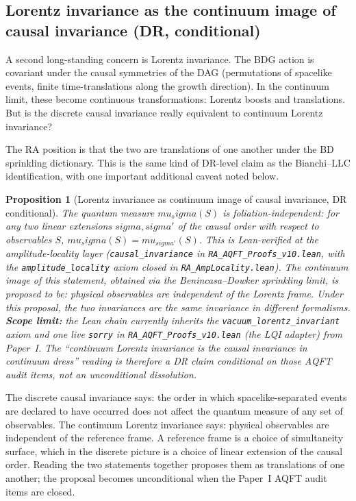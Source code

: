 \documentclass[11pt]{article}
\def\sigma{sigma}%
\def\mu{mu}%
\newtheorem{proposition}{Proposition}
\begin{document}
\subsection{Lorentz invariance as the continuum image of causal invariance (DR, conditional)}
\label{sec:lorentz_is_causal}

A second long-standing concern is Lorentz invariance. The BDG action is covariant under the causal symmetries of the DAG (permutations of spacelike events, finite time-translations along the growth direction). In the continuum limit, these become continuous transformations: Lorentz boosts and translations. But is the discrete causal invariance really equivalent to continuum Lorentz invariance?

The RA position is that the two are translations of one another under the BD sprinkling dictionary. This is the same kind of DR-level claim as the Bianchi--LLC identification, with one important additional caveat noted below.

\begin{proposition}[Lorentz invariance as continuum image of causal invariance, DR conditional]
\label{prop:lorentz_causal}
The quantum measure $\mu_\sigma(S)$ is foliation-independent: for any two linear extensions $\sigma, \sigma'$ of the causal order with respect to observables $S$, $\mu_\sigma(S) = \mu_{\sigma'}(S)$. This is Lean-verified at the amplitude-locality layer (\texttt{causal\_invariance} in \texttt{RA\_AQFT\_Proofs\_v10.lean}, with the \texttt{amplitude\_locality} axiom closed in \texttt{RA\_AmpLocality.lean}). The continuum image of this statement, obtained via the Benincasa--Dowker sprinkling limit, is proposed to be: physical observables are independent of the Lorentz frame. Under this proposal, the two invariances are the same invariance in different formalisms. \textbf{Scope limit:} the Lean chain currently inherits the \texttt{vacuum\_lorentz\_invariant} axiom and one live \texttt{sorry} in \texttt{RA\_AQFT\_Proofs\_v10.lean} (the LQI adapter) from Paper~I. The ``continuum Lorentz invariance is the causal invariance in continuum dress'' reading is therefore a DR claim \emph{conditional on those AQFT audit items}, not an unconditional dissolution.
\end{proposition}

The discrete causal invariance says: the order in which spacelike-separated events are declared to have occurred does not affect the quantum measure of any set of observables. The continuum Lorentz invariance says: physical observables are independent of the reference frame. A reference frame is a choice of simultaneity surface, which in the discrete picture is a choice of linear extension of the causal order. Reading the two statements together proposes them as translations of one another; the proposal becomes unconditional when the Paper~I AQFT audit items are closed.
\end{document}

